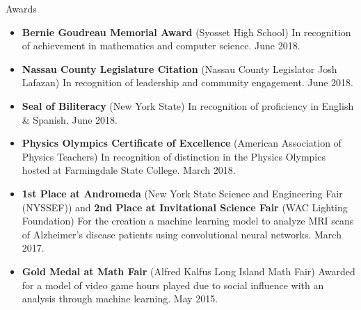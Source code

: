 \documentclass[]{mcdowellcv}
\begin{document}
    \begin{cvsection}{Awards}
        \begin{cvsubsection}{}{}{}
            \begin{itemize}
                \setlength\itemsep{3pt}
                \item \textbf{Bernie Goudreau Memorial Award} (Syosset High School)  In recognition of achievement in mathematics and computer science. June 2018.
                \item \textbf{Nassau County Legislature Citation} (Nassau County Legislator Josh Lafazan)  In recognition of leadership and community engagement. June 2018.
                \item \textbf{Seal of Biliteracy} (New York State)  In recognition of proficiency in English \& Spanish. June 2018.
                \item \textbf{Physics Olympics Certificate of Excellence} (American Association of Physics Teachers)  In recognition of distinction in the Physics Olympics hosted at Farmingdale State College. March 2018.
                \item \textbf{1st Place at Andromeda} (New York State Science and Engineering Fair (NYSSEF)) and \linebreak \textbf{2nd Place at Invitational Science Fair} (WAC Lighting Foundation) For the creation a machine learning model to analyze MRI scans of Alzheimer’s disease patients using convolutional neural networks. March 2017.
                \item \textbf{Gold Medal at Math Fair} (Alfred Kalfus Long Island Math Fair)  Awarded for a model of video game hours played due to social influence with an analysis through machine learning. May 2015.
            \end{itemize}
        \end{cvsubsection}
    \end{cvsection}
\end{document}
